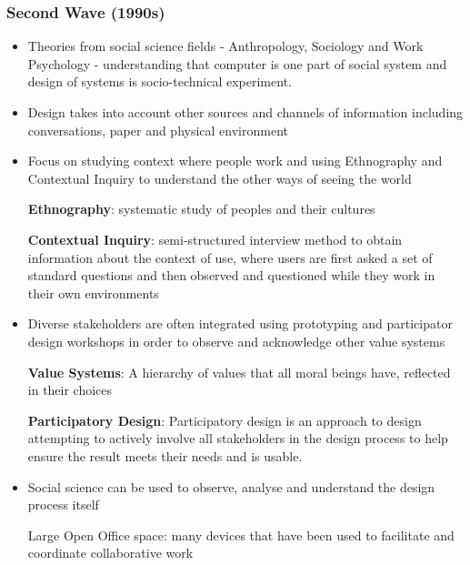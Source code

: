 \documentclass{article}
\newenvironment{definition}{\par\color{blue}}{\par}
\newenvironment{example}{\par\color{brown}}{\par}
\begin{document}
\subsubsection{Second Wave (1990s)}
\begin{itemize}
    \item Theories from social science fields - Anthropology, Sociology and Work Psychology - understanding that computer is one part of social system and design of systems is socio-technical experiment.
    \item Design takes into account other sources and channels of information including conversations, paper and physical environment
    \item Focus on studying context where people work and using Ethnography and Contextual Inquiry to understand the other ways of seeing the world
    
    \begin{definition}
    \textbf{Ethnography}: systematic study of peoples and their cultures
    
    \textbf{Contextual Inquiry}: semi-structured interview method to obtain information about the context of use, where users are first asked a set of standard questions and then observed and questioned while they work in their own environments
    \end{definition}
    
    \item Diverse stakeholders are often integrated using prototyping and participator design workshops in order to observe and acknowledge other value systems
    
    \begin{definition}
    \textbf{Value Systems}: A hierarchy of values that all moral beings have, reflected in their choices
    
    \textbf{Participatory Design}: Participatory design is an approach to design attempting to actively involve all stakeholders in the design process to help ensure the result meets their needs and is usable.
    \end{definition}
    
    \item Social science can be used to observe, analyse and understand the design process itself
    
    \begin{example}
    Large Open Office space: many devices that have been used to facilitate and coordinate collaborative work
    \end{example}
\end{itemize}
\end{document}

